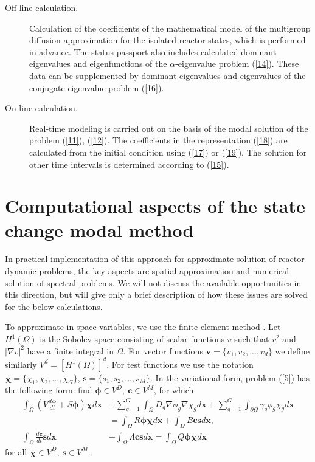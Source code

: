 \documentclass[authoryear]{elsarticle}
\begin{document}
\begin{description}
 \item[Off-line calculation.] Calculation of the coefficients of the mathematical model of the multigroup diffusion approximation for the isolated reactor states, which is performed in advance. The status passport also includes calculated dominant eigenvalues and eigenfunctions of the  $\alpha$-eigenvalue problem (\ref{14}). 
These data can be supplemented by dominant eigenvalues and eigenvalues of the conjugate eigenvalue problem (\ref{16}).
 \item[On-line calculation.] Real-time modeling is carried out on the basis of the modal solution of the problem  (\ref{11}), (\ref{12}).
The coefficients in the representation  (\ref{18}) are calculated from the initial condition using (\ref{17})
or (\ref{19}). The solution for other time intervals is determined according to (\ref{15}).   
\end{description}  

\section{Computational aspects of the state change modal method} 

In practical implementation of this approach for approximate solution of reactor dynamic problems, the key aspects are spatial approximation and numerical solution of spectral problems. We will not discuss the available opportunities in this direction, but will give only a brief description of how these issues are solved for the below calculations. 

To approximate in space variables, we use the finite element method  \citep{brenner,quarteroni}. 
Let $H^1(\Omega)$ is the Sobolev space consisting of scalar functions $v$ such that  $v^2$ and  $\vert\nabla v\vert^2$ have a finite integral in  $\Omega$. For vector functions  $\bm v = \{v_1, v_2, ..., v_d\}$ we define similarly  $V^d = [H^1(\Omega)]^d$.  
For test functions we use the notation  $\bm \chi = \{\chi_1, \chi_2, ..., \chi_G\}$,
$\bm s = \{s_1, s_2, ..., s_M\}$. 
In the variational form, problem  (\ref{5}) has the following form: find $\bm \phi \in V^D, \ \bm c \in V^M$, for which
\begin{equation}\label{20}
\begin{split}
 \int_\Omega \left (V \frac{d \bm\phi}{d t} + S\bm \phi \right )\bm \chi  d\bm x 
 & + \sum_{g=1}^{G} \int_\Omega D_g\nabla \phi_g \nabla \chi_g  d\bm x 
 + \sum_{g=1}^{G} \int_{\partial \Omega} \gamma_g \phi_g \chi_g  d\bm x \\
 & = \int_\Omega R \bm \phi\bm \chi d\bm x + \int_\Omega B\bm c\bm s d\bm x, \\
 \int_\Omega \frac{d \bm{c}}{d t} \bm s d\bm x 
 &+ \int_\Omega \Lambda \bm{c} \bm s d\bm x = \int_\Omega Q \bm{\phi} \bm \chi d\bm x
\end{split}
\end{equation}
for all $\bm \chi  \in V^D, \ \bm s \in V^M$.
\end{document}
